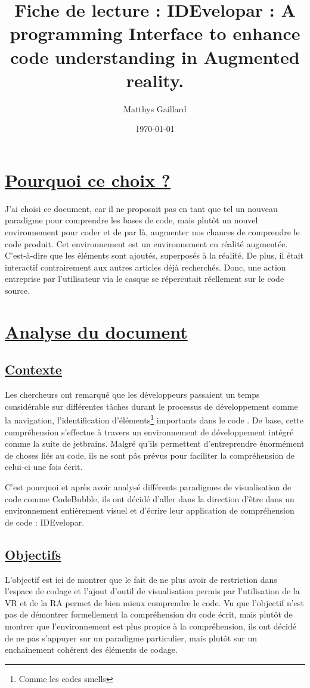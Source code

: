 \documentclass[a4paper,10pt, oneside]{article}
\title{Fiche de lecture : IDEvelopar : A programming Interface to enhance code understanding in Augmented reality.}
\author{Matthys Gaillard}
\date{\today}
\newcommand{\li}{\newline}
\begin{document}
\maketitle
\section{\ul{Pourquoi ce choix ?}}  
    \par J'ai choisi ce document\cite{A1}, car il ne proposait pas en tant que tel un nouveau paradigme pour comprendre les bases de code, mais plutôt un nouvel environnement pour coder et de par là,
    augmenter nos chances de comprendre le code produit. Cet environnement est un environnement en réalité augmentée. C'est-à-dire que les éléments sont ajoutés, superposés à la réalité.
    De plus, il était interactif contrairement aux autres articles déjà recherchés. Donc, une action entreprise par l'utilisateur via le casque se répercutait réellement sur le code source.
\section{\ul{Analyse du document}}
\subsection{\ul{Contexte}}
        \par Les chercheurs ont remarqué que les développeurs passaient un temps considérable sur différentes tâches durant le processus de développement comme la navigation, l'identification d'éléments\footnote{Comme les codes smells} importants dans le code
        . De base, cette compréhension s'effectue à travers un environnement de développement intégré comme la suite de jetbrains. Malgré qu'ils permettent d'entreprendre énormément de choses liés au code, ils ne sont pâs prévus pour faciliter la compréhension de celui-ci une fois écrit.\li 
        \par C'est pourquoi et après avoir analysé différents paradigmes de visualisation de code comme CodeBubble, ils ont décidé d'aller dans la direction d'être dans un environnement entièrement visuel et d'écrire leur application de compréhension de code : IDEvelopar.
    
\subsection{\ul{Objectifs}}
        \par L'objectif est ici de montrer que le fait de ne plus avoir de restriction dans l'espace de codage et l'ajout d'outil de visualisation permis par l'utilisation de la VR et de la RA permet de bien mieux comprendre le code. 
        Vu que l'objectif n'est pas de démontrer formellement la compréhension du code écrit, mais plutôt de montrer que l'environnement est plus propice à la compréhension, ils ont décidé de ne pas s'appuyer sur un paradigme particulier, mais plutôt sur 
        un enchaînement cohérent des éléments de codage.
\end{document}
